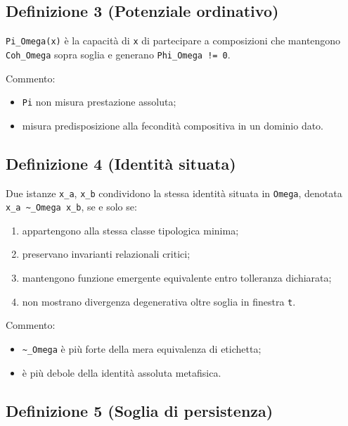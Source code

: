 \subsection{Definizione 3 (Potenziale ordinativo)}

\texttt{Pi\_Omega(x)} è la capacità di \texttt{x} di partecipare a composizioni che mantengono \texttt{Coh\_Omega} sopra soglia e generano \texttt{Phi\_Omega\ !=\ 0}.

Commento:

\begin{itemize}
\tightlist
\item
  \texttt{Pi} non misura prestazione assoluta;
\item
  misura predisposizione alla fecondità compositiva in un dominio dato.
\end{itemize}

\subsection{Definizione 4 (Identità situata)}

Due istanze \texttt{x\_a}, \texttt{x\_b} condividono la stessa identità situata in \texttt{Omega}, denotata \texttt{x\_a\ \textasciitilde{}\_Omega\ x\_b}, se e solo se:

\begin{enumerate}
\def\labelenumi{\arabic{enumi}.}
\tightlist
\item
  appartengono alla stessa classe tipologica minima;
\item
  preservano invarianti relazionali critici;
\item
  mantengono funzione emergente equivalente entro tolleranza dichiarata;
\item
  non mostrano divergenza degenerativa oltre soglia in finestra \texttt{t}.
\end{enumerate}

Commento:

\begin{itemize}
\tightlist
\item
  \texttt{\textasciitilde{}\_Omega} è più forte della mera equivalenza di etichetta;
\item
  è più debole della identità assoluta metafisica.
\end{itemize}

\subsection{Definizione 5 (Soglia di persistenza)}

